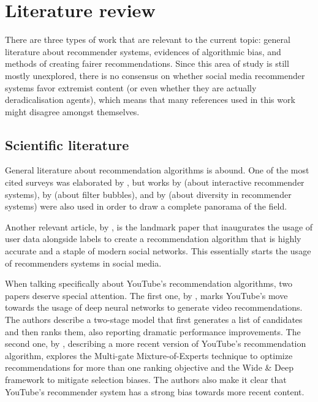 
\chapter{Literature review}
\label{cap:review}

There are three types of work that are relevant to the current topic: general
literature about recommender systems, evidences of algorithmic bias, and methods
of creating fairer recommendations. Since this area of study is still mostly
unexplored, there is no consensus on whether social media recommender systems
favor extremist content (or even whether they are actually deradicalisation
agents), which means that many references used in this work might disagree
amongst themselves.

\section{Scientific literature}
\label{cap:scientific}

General literature about recommendation algorithms is abound. One of the most
cited surveys was elaborated by \citet{bobadilla_recommender_2013}, but works by
\citet{he_interactive_2016} (about interactive recommender systems), by
\citep{nguyen_exploring_2014} (about filter bubbles), and by
\citet{kunaver_diversity_2017} (about diversity in recommender systems) were
also used in order to draw a complete panorama of the field.

Another relevant article, by \citet{guy_social_2010}, is the landmark paper that
inaugurates the usage of user data alongside labels to create a recommendation
algorithm that is highly accurate and a staple of modern social networks. This
essentially starts the usage of recommenders systems in social media.

When talking specifically about YouTube's recommendation algorithms, two papers
deserve special attention. The first one, by \citet{covington_deep_2016}, marks
YouTube's move towards the usage of deep neural networks to generate video
recommendations. The authors describe a two-stage model that first generates a
list of candidates and then ranks them, also reporting dramatic performance
improvements. The second one, by \citet{zhao_recommending_2019}, describing a
more recent version of YouTube's recommendation algorithm, explores the
Multi-gate Mixture-of-Experts technique to optimize recommendations for more
than one ranking objective and the Wide \& Deep framework to mitigate selection
biases. The authors also make it clear that YouTube's recommender system has a
strong bias towards more recent content.

